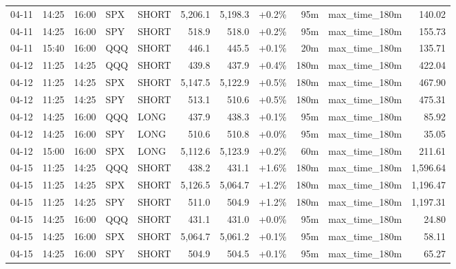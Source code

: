 \documentclass[11pt,a4paper,twoside]{article}
\begin{document}
\begin{center}
\begin{longtable}{>{\color{txtmain}}l l l l l r r r r >{\color{txtmain}}l r}
04-11 & 14:25 & 16:00 & SPX & SHORT & 5,206.1 & 5,198.3 & \textcolor{wingreen}{+0.2\%} & 95m & max\_time\_180m & \textcolor{wingreen}{140.02} \\
04-11 & 14:25 & 16:00 & SPY & SHORT & 518.9 & 518.0 & \textcolor{wingreen}{+0.2\%} & 95m & max\_time\_180m & \textcolor{wingreen}{155.73} \\
04-11 & 15:40 & 16:00 & QQQ & SHORT & 446.1 & 445.5 & \textcolor{wingreen}{+0.1\%} & 20m & max\_time\_180m & \textcolor{wingreen}{135.71} \\
04-12 & 11:25 & 14:25 & QQQ & SHORT & 439.8 & 437.9 & \textcolor{wingreen}{+0.4\%} & 180m & max\_time\_180m & \textcolor{wingreen}{422.04} \\
04-12 & 11:25 & 14:25 & SPX & SHORT & 5,147.5 & 5,122.9 & \textcolor{wingreen}{+0.5\%} & 180m & max\_time\_180m & \textcolor{wingreen}{467.90} \\
04-12 & 11:25 & 14:25 & SPY & SHORT & 513.1 & 510.6 & \textcolor{wingreen}{+0.5\%} & 180m & max\_time\_180m & \textcolor{wingreen}{475.31} \\
04-12 & 14:25 & 16:00 & QQQ & LONG & 437.9 & 438.3 & \textcolor{wingreen}{+0.1\%} & 95m & max\_time\_180m & \textcolor{wingreen}{85.92} \\
04-12 & 14:25 & 16:00 & SPY & LONG & 510.6 & 510.8 & \textcolor{wingreen}{+0.0\%} & 95m & max\_time\_180m & \textcolor{wingreen}{35.05} \\
04-12 & 15:00 & 16:00 & SPX & LONG & 5,112.6 & 5,123.9 & \textcolor{wingreen}{+0.2\%} & 60m & max\_time\_180m & \textcolor{wingreen}{211.61} \\
04-15 & 11:25 & 14:25 & QQQ & SHORT & 438.2 & 431.1 & \textcolor{wingreen}{+1.6\%} & 180m & max\_time\_180m & \textcolor{wingreen}{1,596.64} \\
04-15 & 11:25 & 14:25 & SPX & SHORT & 5,126.5 & 5,064.7 & \textcolor{wingreen}{+1.2\%} & 180m & max\_time\_180m & \textcolor{wingreen}{1,196.47} \\
04-15 & 11:25 & 14:25 & SPY & SHORT & 511.0 & 504.9 & \textcolor{wingreen}{+1.2\%} & 180m & max\_time\_180m & \textcolor{wingreen}{1,197.31} \\
04-15 & 14:25 & 16:00 & QQQ & SHORT & 431.1 & 431.0 & \textcolor{wingreen}{+0.0\%} & 95m & max\_time\_180m & \textcolor{wingreen}{24.80} \\
04-15 & 14:25 & 16:00 & SPX & SHORT & 5,064.7 & 5,061.2 & \textcolor{wingreen}{+0.1\%} & 95m & max\_time\_180m & \textcolor{wingreen}{58.11} \\
04-15 & 14:25 & 16:00 & SPY & SHORT & 504.9 & 504.5 & \textcolor{wingreen}{+0.1\%} & 95m & max\_time\_180m & \textcolor{wingreen}{65.27} \\

\end{longtable}
\end{center}
\end{document}
